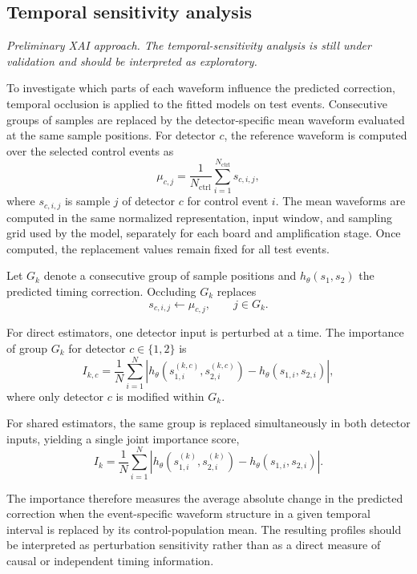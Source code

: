 \subsection{Temporal sensitivity analysis}
\textit{Preliminary XAI approach. The temporal-sensitivity analysis is
still under validation and should be interpreted as exploratory.}

To investigate which parts of each waveform influence the
predicted correction, temporal occlusion is applied to the fitted
models on test events. Consecutive groups of samples are replaced by
the detector-specific mean waveform evaluated at the same sample
positions. For detector $c$, the reference waveform is computed over
the selected control events as
\begin{equation}
\mu_{c,j}
=
\frac{1}{N_{\mathrm{ctrl}}}
\sum_{i=1}^{N_{\mathrm{ctrl}}}
s_{c,i,j},
\label{eq:xai-mean-waveform}
\end{equation}
where $s_{c,i,j}$ is sample $j$ of detector $c$ for control event $i$.
The mean waveforms are computed in the same normalized representation,
input window, and sampling grid used by the model, separately for each
board and amplification stage. Once computed, the replacement values
remain fixed for all test events.

Let $G_k$ denote a consecutive group of sample positions and
$h_\theta(s_1,s_2)$ the predicted timing correction. Occluding
$G_k$ replaces
\begin{equation}
s_{c,i,j} \leftarrow \mu_{c,j},
\qquad j\in G_k .
\label{eq:xai-occlusion}
\end{equation}

For direct estimators, one detector input is perturbed at a time.
The importance of group $G_k$ for detector $c\in\{1,2\}$ is
\begin{equation}
I_{k,c}
=
\frac{1}{N}
\sum_{i=1}^{N}
\left|
h_\theta\!\left(s_{1,i}^{(k,c)},s_{2,i}^{(k,c)}\right)
-
h_\theta(s_{1,i},s_{2,i})
\right|,
\label{eq:xai-direct}
\end{equation}
where only detector $c$ is modified within $G_k$.

For shared estimators, the same group is replaced simultaneously in
both detector inputs, yielding a single joint importance score,
\begin{equation}
I_k
=
\frac{1}{N}
\sum_{i=1}^{N}
\left|
h_\theta\!\left(s_{1,i}^{(k)},s_{2,i}^{(k)}\right)
-
h_\theta(s_{1,i},s_{2,i})
\right|.
\label{eq:xai-shared}
\end{equation}

The importance therefore measures the average absolute change in the
predicted correction when the event-specific waveform structure in a
given temporal interval is replaced by its control-population mean.
The resulting profiles should be interpreted as
perturbation sensitivity rather than as a direct measure of causal or
independent timing information.





